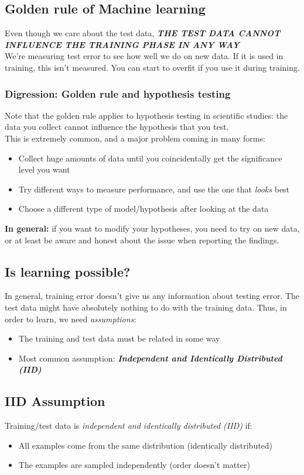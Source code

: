 \documentclass{article}
\theoremstyle{definition}
\begin{document}
\subsection*{Golden rule of Machine learning}
Even though we care about the test data, \textsl{\textbf{THE TEST DATA CANNOT INFLUENCE THE TRAINING PHASE IN ANY WAY}}\\
We’re measuring test error to see how well we do on new data. If it is used in training, this isn't measured. You can start to overfit if you use it during training. 

\subsubsection*{Digression: Golden rule and hypothesis testing}
Note that the golden rule applies to hypothesis testing in scientific studies: the data you collect cannot influence the hypothesis that you test. \\
This is extremely common, and a major problem coming in many forms:
\begin{itemize}
	\item Collect huge amounts of data until you coincidentally get the significance level you want
	\item Try different ways to measure performance, and use the one that \textsl{looks} best
	\item Choose a different type of model/hypothesis after looking at the data
\end{itemize}
{\bf In general:} if you want to modify your hypotheses, you need to try on new data, or at least be aware and honest about the issue when reporting the findings. 

\subsection*{Is learning possible?}
In general, training error doesn't give us any information about testing error. The test data might have absolutely nothing to do with the training data. Thus, in order to learn, we need \textsl{assumptions}:
\begin{itemize}
	\item The training and test data must be related in some way
	\item Most common assumption: \textsl{\textbf{Independent and Identically Distributed (IID)}}
\end{itemize}

\subsection*{IID Assumption}
Training/test data is \textsl{independent and identically distributed (IID)} if:
\begin{itemize}
	\item All examples come from the same distribution (identically distributed)
	\item The examples are sampled independently (order doesn't matter)
\end{itemize}
\end{document}
